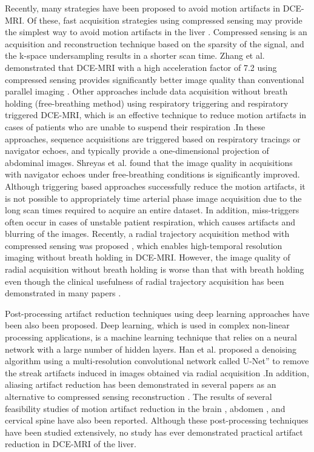 \documentclass[num-refs]{wiley-article}
\begin{document}
 Recently, many strategies have been proposed to avoid motion artifacts in DCE-MRI. Of these, fast acquisition strategies using compressed sensing may provide the simplest way to avoid motion artifacts in the liver \cite{vasanawala2010improved}\cite{zhang2014clinical}\cite{jaimes2016strategies}. Compressed sensing is an acquisition and reconstruction technique based on the sparsity of the signal, and the k-space undersampling results in a shorter scan time. Zhang et al. demonstrated that DCE-MRI with a high acceleration factor of 7.2 using compressed sensing provides significantly better image quality than conventional parallel imaging \cite{zhang2014clinical}. Other approaches include data acquisition without breath holding (free-breathing method) using respiratory triggering and respiratory triggered DCE-MRI, which is an effective technique to reduce motion artifacts in cases of patients who are unable to suspend their respiration \cite{vasanawala2010navigated}\cite{chavhan2013abdominal}.In these approaches, sequence acquisitions are triggered based on respiratory tracings or navigator echoes, and typically provide a one-dimensional projection of abdominal images. Shreyas et al. found that the image quality in acquisitions with navigator echoes under free-breathing conditions is significantly improved. Although triggering based approaches successfully reduce the motion artifacts, it is not possible to appropriately time arterial phase image acquisition due to the long scan times required to acquire an entire dataset. In addition, miss-triggers often occur in cases of unstable patient respiration, which causes artifacts and blurring of the images. Recently, a radial trajectory acquisition method with compressed sensing was proposed  \cite{feng2014golden}\cite{feng2016xd}, which enables high-temporal resolution imaging without breath holding in DCE-MRI. However, the image quality of radial acquisition without breath holding is worse than that with breath holding even though the clinical usefulness of radial trajectory acquisition has been demonstrated in many papers \cite{chandarana2011free}\cite{chandarana2013free}.\cite{chandarana2014free}


Post-processing artifact reduction techniques using deep learning approaches have been also been proposed. Deep learning, which is used in complex non-linear processing applications, is a machine learning technique that relies on a neural network with a large number of hidden layers. Han et al. proposed a denoising algorithm using a multi-resolution convolutional network called U-Net” to remove the streak artifacts induced in images obtained via radial acquisition \cite{han2018deep}.In addition, aliasing artifact reduction has been demonstrated in several papers as an alternative to compressed sensing reconstruction \cite{lee2017deep}\cite{yang2018dagan}\cite{hyun2018deep}. The results of several feasibility studies of motion artifact reduction in the brain \cite{Karsten2018ismrm}\cite{Patricia2018ismrm}\cite{Kamlesh2018ismrm}, abdomen \cite{Daiki2018ismrm}, and cervical spine \cite{Hongpyo2018ismrm} have also been reported. Although these post-processing techniques have been studied extensively, no study has ever demonstrated practical artifact reduction in DCE-MRI of the liver.
\end{document}
